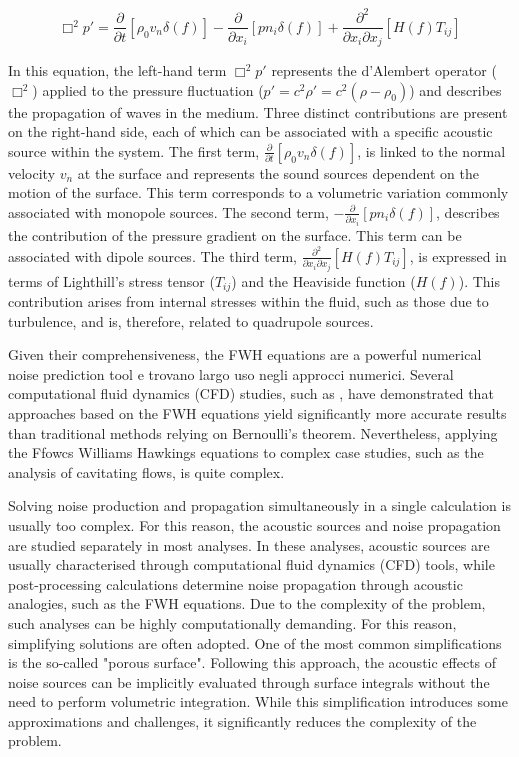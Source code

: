 \begin{equation}
    \Box^2 p' = \frac{\partial}{\partial t} \left[ \rho_0 v_n \delta(f) \right] - \frac{\partial}{\partial x_i} \left[ p n_i \delta(f) \right] + \frac{\partial^2}{\partial x_i \partial x_j} \left[ H(f) T_{ij} \right]
    \label{eq:FWH}
\end{equation}

In this equation, the left-hand term $\Box^2p'$ represents the d'Alembert operator ($\Box^2$) applied to the pressure fluctuation ($p' = c^2 \rho' = c^2 (\rho - \rho_0)$) and describes the propagation of waves in the medium. 
Three distinct contributions are present on the right-hand side, each of which can be associated with a specific acoustic source within the system.
The first term, $\frac{\partial}{\partial t} \left[ \rho_0 v_n \delta(f) \right]$, is linked to the normal velocity $v_n$ at the surface and represents the sound sources dependent on the motion of the surface. This term corresponds to a volumetric variation commonly associated with monopole sources.
The second term, $-\frac{\partial}{\partial x_i} \left[ p n_i \delta(f) \right]$, describes the contribution of the pressure gradient on the surface. This term can be associated with dipole sources.
The third term, $\frac{\partial^2}{\partial x_i \partial x_j} \left[ H(f) T_{ij} \right]$, is expressed in terms of Lighthill's stress tensor ($T_{ij}$) and the Heaviside function ($H(f)$). This contribution arises from internal stresses within the fluid, such as those due to turbulence, and is, therefore, related to quadrupole sources.

Given their comprehensiveness, the FWH equations are a powerful numerical noise prediction tool e trovano largo uso negli approcci numerici. Several computational fluid dynamics (CFD) studies, such as \cite{Testa2018}, have demonstrated that approaches based on the FWH equations yield significantly more accurate results than traditional methods relying on Bernoulli’s theorem.
Nevertheless, applying the Ffowcs Williams Hawkings equations to complex case studies, such as the analysis of cavitating flows, is quite complex.

Solving noise production and propagation simultaneously in a single calculation is usually too complex. For this reason, the acoustic sources and noise propagation are studied separately in most analyses. 
In these analyses, acoustic sources are usually characterised through computational fluid dynamics (CFD) tools, while post-processing calculations determine noise propagation through acoustic analogies, such as the FWH equations.
Due to the complexity of the problem, such analyses can be highly computationally demanding. For this reason, simplifying solutions are often adopted. One of the most common simplifications is the so-called "porous surface". Following this approach, the acoustic effects of noise sources can be implicitly evaluated through surface integrals without the need to perform volumetric integration. 
While this simplification introduces some approximations and challenges, it significantly reduces the complexity of the problem.

